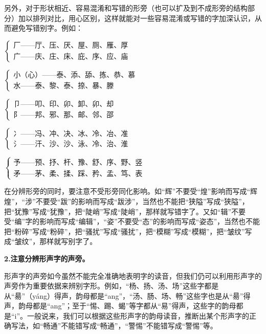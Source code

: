 另外，对于形状相近、容易混淆和写错的形旁（也可以扩及到不成形旁的结构部分）加以排列对比，用心区别，这样就能对一些容易混淆或写错的字加深认识，从而避免写错别字。例如：
\begin{flushleft}
	$
	\begin{cases}
		\text{厂——厅、压、厌、屋、厕、雁、厚}\\
		\text{广——庆、庄、床、庇、序、应、庙}
	\end{cases}
	$

	\vspace{1em}

	$
	\begin{cases}
		\text{小（心）——泰、添、舔、拣、恭、慕}\\
		\text{水——泰、黎、泰、捺、暴、滕}
	\end{cases}
	$

	\vspace{1em}

	$
	\begin{cases}
		\text{卩——叩、印、卯、卸、卯、却}\\
		\text{阝——邦、邪、那、邮、邻、邵}
	\end{cases}
	$

	\vspace{1em}

	$
	\begin{cases}
		\text{冫——冯、冲、决、冰、冷、冶、准}\\
		\text{氵——汗、沙、沙、泳、冷、治、淮}
	\end{cases}
	$

    \vspace{1em}

	$
	\begin{cases}
		\text{予——预、抒、杆、豫、舒、序、野、竖}\\
		\text{矛——茅、柔、揉、踩、矜、孟、笃、表}
	\end{cases}
	$
\end{flushleft}

在分辨形旁的同时，要注意不受形旁同化影响。如“辉”不要受“煌”影响而写成“辉煌”，“涉”不要受“跋”的影响而写成“跋涉”，当然也不能把“狭隘”写成“狭隘”，把“犹豫”写成“犹豫”，把“陡峭”写成“陡峭”，那样就写错字了。又如“辑”不要受“编”字的影响而写成“编辑”，“姿”不要受“态”的影响而写成“姿态”，当然也不能把“粉碎”写成“粉碎”，把“骚扰”写成“骚扰”，把“模糊”写成“模糊”，把“皱纹”写成“皱纹”，那样就写别字了。

\textbf{2.注意分辨形声字的声旁。}

形声字的声旁如今虽然不能完全准确地表明字的读音，但我们仍可以利用形声字的声旁作为重要依据来辨别字形。例如，“杨、扬、汤、场”这些字都是从“昜”（yáng）得声，韵母都是“ang”，“汤、肠、场、畅”这些字也是从“昜”得声，韵母都是“ang”；至于“惕、踢、蝎”等字都从“易”得声，这些字的韵母都是“i”。一般说来，我们可以根据这些形声字的韵母读音，推断出某个形声字的正确写法，如“畅通”不能错写成“畅通”，“警惕”不能错写成“警惕”等。

